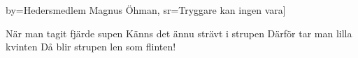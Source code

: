 	by={Hedersmedlem Magnus Öhman},					
	sr={Tryggare kan ingen vara}]					
	
\beginverse*
När man tagit fjärde supen
Känns det ännu strävt i strupen
Därför tar man lilla kvinten
Då blir strupen len som flinten!
\endverse									
\endsong							
